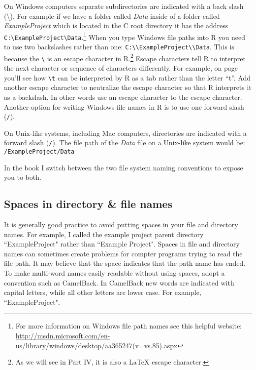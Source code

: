 On Windows computers separate subdirectories are indicated with a back slash (\textbackslash{}). For example if we have a folder called {\emph{Data}} inside of a folder called {\emph{ExampleProject}} which is located in the C root directory it has the address \texttt{C:\textbackslash{}ExampleProject\textbackslash{}Data}.\footnote{For more information on Windows file path names see this helpful website: \url{http://msdn.microsoft.com/en-us/library/windows/desktop/aa365247(v=vs.85).aspx}} When you type Windows file paths into R you need to use two backslashes rather than one: \texttt{C:\textbackslash{}\textbackslash{}ExampleProject\textbackslash{}\textbackslash{}Data}. This is because the \texttt{\textbackslash{}} is an escape character in R.\footnote{As we will see in Part IV, it is also a LaTeX escape character.} Escape characters tell R to interpret the next character or sequence of characters differently. For example, on page \pageref{TSVEscape} you'll see how \texttt{\textbackslash{}t} can be interpreted by R as a tab rather than the letter ``t''. Add another escape character to neutralize the escape character so that R interprets it as a backslash. In other words use an escape character to the escape character. Another option for writing Windows file names in R is to use one forward slash (\texttt{/}).  

On Unix-like systems, including Mac computers, directories are indicated with a forward slash (\texttt{/}). The file path of the {\emph{Data}} file on a Unix-like system would be: \texttt{/ExampleProject/Data}

In the book I switch between the two file system naming conventions to expose you to both.

\subsection{Spaces in directory \& file names}

It is generally good practice to avoid putting spaces in your file and directory names. For example, I called the example project parent directory ``ExampleProject" rather than ``Example Project". Spaces in file and directory names can sometimes create problems for compter programs trying to read the file path. It may believe that the space indicates that the path name has ended. To make multi-word names easily readable without using spaces, adopt a convention such as CamelBack. In CamelBack new words are indicated with capital letters, while all other letters are lower case. For example, ``ExampleProject".


